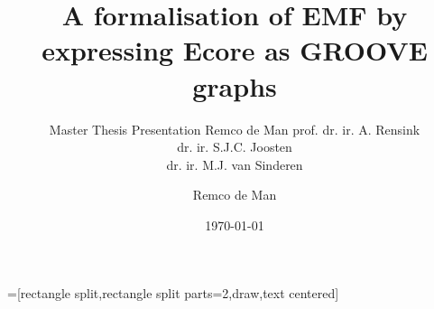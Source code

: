 \title{A formalisation of EMF by expressing Ecore as GROOVE graphs}
\author{Remco de Man}
\subtitle{Master Thesis Presentation \newline\newline Remco de Man \newline \newline prof. dr. ir. A. Rensink\\dr. ir. S.J.C. Joosten\\dr. ir. M.J. van Sinderen}
\date{\today}

\usetikzlibrary{arrows.meta}
=[rectangle split,rectangle split parts=2,draw,text centered]

\newtheorem{thm}{Theorem}[section]
\newtheorem{cor}[thm]{Corollary}
\newtheorem{lem}[thm]{Lemma}
\newtheorem{defin}[thm]{Definition}